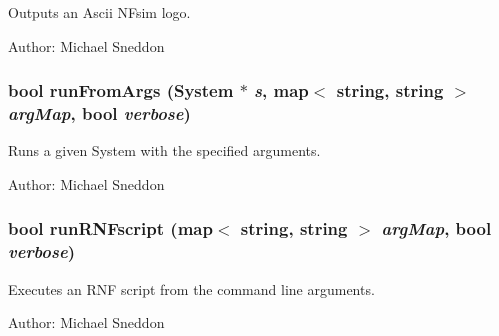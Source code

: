 Outputs an Ascii NFsim logo. 

\begin{Desc}
\item[Author:]Michael Sneddon \end{Desc}
\subsubsection{\setlength{\rightskip}{0pt plus 5cm}bool runFromArgs ({\bf System} $\ast$ {\em s}, map$<$ string, string $>$ {\em argMap}, bool {\em verbose})}\label{NFsim_8cpp_1df3932ce2db1db1f6c546529a162aa2}


Runs a given System with the specified arguments. 

\begin{Desc}
\item[Author:]Michael Sneddon \end{Desc}
\subsubsection{\setlength{\rightskip}{0pt plus 5cm}bool runRNFscript (map$<$ string, string $>$ {\em argMap}, bool {\em verbose})}\label{NFsim_8cpp_845f3f1c09965a9e54010b0f0c4c84f2}


Executes an RNF script from the command line arguments. 

\begin{Desc}
\item[Author:]Michael Sneddon \end{Desc}
